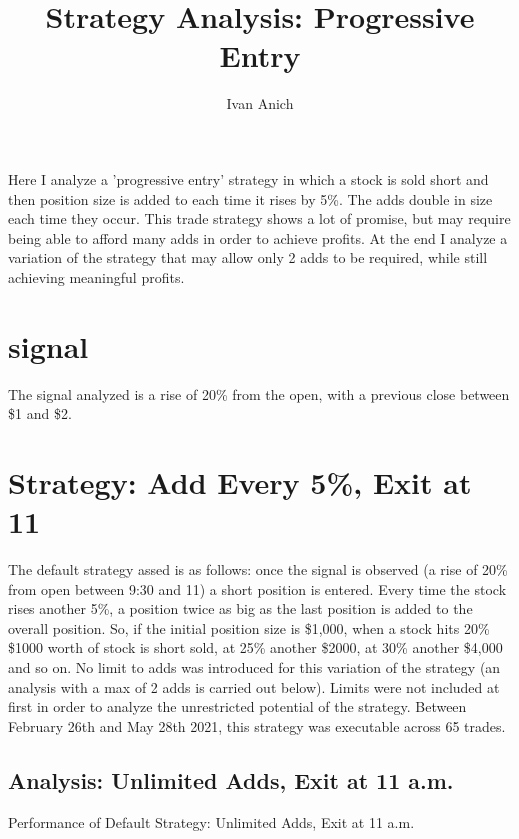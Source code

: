 \documentclass{article}
\title{Strategy Analysis: Progressive Entry}
\author{Ivan Anich}
\begin{document}
\maketitle

Here I analyze a 'progressive entry' strategy in which a stock is sold short and then position size is added to each time it rises by 5\%. The adds double in size each time they occur. This trade strategy shows a lot of promise, but may require being able to afford many adds in order to achieve profits. At the end I analyze a variation of the strategy that may allow only 2 adds to be required, while still achieving meaningful profits.

\section{signal}

The signal analyzed is a rise of 20\% from the open, with a previous close between \$1 and \$2. 

\section{Strategy: Add Every 5\%, Exit at 11}

The default strategy assed is as follows: once the signal is observed (a rise of 20\% from open between 9:30 and 11) a short position is entered. Every time the stock rises another 5\%, a position twice as big as the last position is added to the overall position. So, if the initial position size is \$1,000, when a stock hits 20\% \$1000 worth of stock is short sold, at 25\% another \$2000, at 30\% another \$4,000 and so on. No limit to adds was introduced for this variation of the strategy (an analysis with a max of 2 adds is carried out below). Limits were not included at first in order to analyze the unrestricted potential of the strategy. Between February 26th and May 28th 2021, this strategy was executable across 65 trades.

\pagebreak

\subsection{Analysis:  Unlimited Adds, Exit at 11 a.m.}

\begin{table}
\caption{Performance of Default Strategy: Unlimited Adds, Exit at 11 a.m.}
\\[2ex]


\\[2ex]


\\[2ex]

\label{tab_strat}
\end{table}
\end{document}

